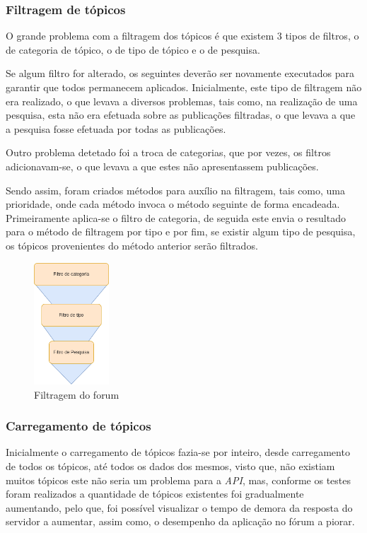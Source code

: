 \subsubsection{Filtragem de tópicos}
O grande problema com a filtragem dos tópicos é que existem 3 tipos de filtros, o de categoria de tópico, o de tipo de tópico e o de pesquisa. 

Se algum filtro for alterado, os seguintes deverão ser novamente executados para garantir que todos permanecem aplicados. Inicialmente, este tipo de filtragem não era realizado, o que levava a diversos problemas, tais como, na realização de uma pesquisa, esta não era efetuada sobre as publicações filtradas, o que levava a que a pesquisa fosse efetuada por todas as publicações.

Outro problema detetado foi a troca de categorias, que por vezes, os filtros adicionavam-se, o que levava a que estes não apresentassem publicações.

Sendo assim, foram criados métodos para auxílio na filtragem, tais como, uma prioridade, onde cada método invoca o método seguinte de forma encadeada. Primeiramente aplica-se o filtro de categoria, de seguida este envia o resultado para o método de filtragem por tipo e por fim, se existir algum tipo de pesquisa, os tópicos provenientes do método anterior serão filtrados.

\begin{figure}[htb]
  \centering
  \includegraphics[width=0.25\textwidth]{images/implementacao/frontend/forum/filtros/filtros.png}
  \caption{Filtragem do forum}
  \label{fig:73}
\end{figure}

\newpage

\subsubsection{Carregamento de tópicos}
Inicialmente o carregamento de tópicos fazia-se por inteiro, desde carregamento de todos os tópicos, até todos os dados dos mesmos, visto que, não existiam muitos tópicos este não seria um problema para a \textit{API}, mas, conforme os testes foram realizados a quantidade de tópicos existentes foi gradualmente aumentando, pelo que, foi possível visualizar o tempo de demora da resposta do servidor a aumentar, assim como, o desempenho da aplicação no fórum a piorar.

